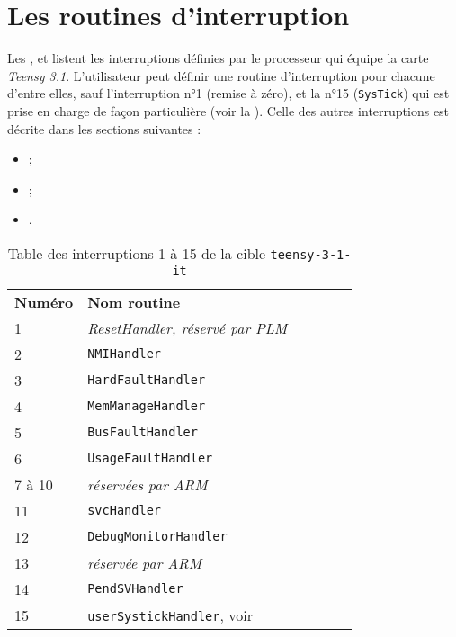 \section{Les routines d'interruption}

Les ,  et  listent les interruptions définies par le processeur qui équipe la carte \emph{Teensy 3.1}. L'utilisateur peut définir une routine d'interruption pour chacune d'entre elles, sauf l'interruption n°1 (remise à zéro), et la n°15 (\texttt{SysTick}) qui est prise en charge de façon particulière (voir la ). Celle des autres interruptions est décrite dans les sections suivantes :
\begin{itemize}
  \item {} ;
  \item {} ;
  \item {}.
\end{itemize}


\begin{table}[!t]
  \centering
  \begin{tabular}{llllll}
    \textbf{Numéro}& \textbf{Nom routine} \\
    1  & \emph{ResetHandler, réservé par PLM} \\
    2  & \texttt{NMIHandler}\\
    3  & \texttt{HardFaultHandler}\\
    4  & \texttt{MemManageHandler}\\
    5  & \texttt{BusFaultHandler}\\
    6  & \texttt{UsageFaultHandler}\\
    7 à 10 & \emph{réservées par ARM} \\
    11 & \texttt{svcHandler}\\
    12 & \texttt{DebugMonitorHandler}\\
    13 & \emph{réservée par ARM} \\
    14 & \texttt{PendSVHandler}\\
    15 & \texttt{userSystickHandler}, voir {SystickPourTeensy31It} \\
  \end{tabular}
  \caption{Table des interruptions 1 à 15 de la cible \texttt{teensy-3-1-it}}
  \ligne
\end{table}

